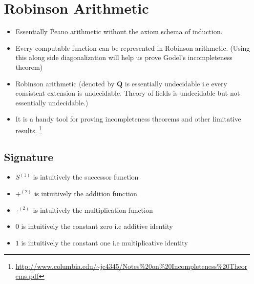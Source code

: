 \documentclass[
11pt,notheorems,hyperref={pdfauthor=whatever}
]{beamer}
\begin{document}
\section{Robinson Arithmetic}
\begin{frame}
\begin{itemize}
    \setlength\itemsep{2em}
    \item Essentially Peano arithmetic without the axiom schema of induction.
    \item Every computable function can be represented in Robinson arithmetic. \cite{odifreddi1992classical} (Using this along side diagonalization will help us prove Godel's incompleteness theorem)
    \item Robinson arithmetic (denoted by $\textbf{Q}$ is essentially undecidable i.e every consistent extension is undecidable. Theory of fields is undecidable but not essentially undecidable.)
    \item It is a handy tool for proving incompleteness theorems and other limitative results. \footnote{\url{http://www.columbia.edu/~jc4345/Notes\%20on\%20Incompleteness\%20Theorems.pdf}}
\end{itemize}
\end{frame}

\subsection{Signature}
\begin{frame}
\begin{itemize}
    \setlength\itemsep{2em}
    \item $S^{(1)}$ is intuitively the successor function
    \item $+^{(2)}$ is intuitively the addition function
    \item $\cdot^{(2)}$ is intuitively the multiplication function
    \item $0$ is intuitively the constant zero i.e additive identity
    \item $1$ is intuitively the constant one i.e multiplicative identity
\end{itemize}
\end{frame}
\end{document}
